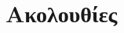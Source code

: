 







\everymath{\displaystyle}

\setlength{\parindent}{0pt}

\pagestyle{vangelis}

% 

\chapter{Ακολουθίες}


% 

% 


